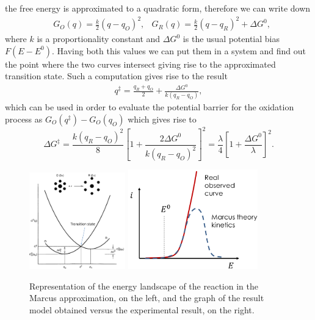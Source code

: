 {
    the free energy is approximated to a quadratic form, therefore we can write down
    \begin{align}
        &G_O(q) = \frac{k}{2}(q-q_O)^2, &G_R(q) = \frac{k}{2}(q - q_R)^2 + \Delta G^0,
    \end{align}
    where $k$ is a proportionality constant and $\Delta G^0$ is the usual potential bias $F(E-E^0)$. Having both this values we can put them in a system and find out the point where the two curves intersect giving rise to the approximated transition state. Such a computation gives rise to the result
    \begin{align}
        q^\ddagger = \frac{q_R + q_O}{2} + \frac{\Delta G^0}{k(q_R - q_O)},
    \end{align}
    which can be used in order to evaluate the potential barrier for the oxidation process as $G_O(q^\ddagger) - G_O(q_O)$ which gives rise to
    \begin{equation}
        \Delta G^\ddagger = \frac{k(q_R - q_O)^2}{8}\left[ 1 + \frac{2\Delta G^0}{k(q_R - q_O)^2} \right]^2 = \frac{\lambda}{4}\left[ 1 + \frac{\Delta G^0}{\lambda} \right]^2.
    \end{equation}
    \begin{figure}[t]
        \centering
        \includegraphics[width=0.37\textwidth]{Immagini/MarcusApprox.png}
        \includegraphics[width=0.5\textwidth]{Immagini/MarcusRes.png}
        \caption{
            Representation of the energy landscape of the reaction in the Marcus approximation, on the left, and the graph of the result model obtained versus the experimental result, on the right.
}
\end{figure}}
